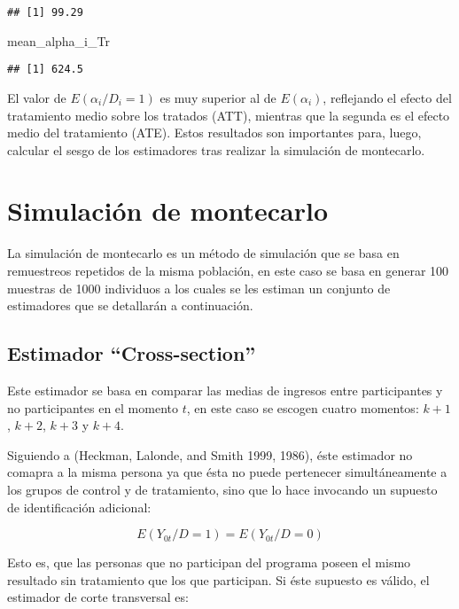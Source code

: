 \documentclass[]{article}
\newenvironment{Shaded}{\begin{snugshade}}{\end{snugshade}}
\newcommand{\NormalTok}[1]{{#1}}
\begin{document}
\begin{verbatim}
## [1] 99.29
\end{verbatim}

\begin{Shaded}
\begin{Highlighting}[]
\NormalTok{mean_alpha_i_Tr}
\end{Highlighting}
\end{Shaded}

\begin{verbatim}
## [1] 624.5
\end{verbatim}

El valor de $E(\alpha_{i}/D_{i}=1)$ es muy superior al de
$E(\alpha_{i})$, reflejando el efecto del tratamiento medio sobre los
tratados (ATT), mientras que la segunda es el efecto medio del
tratamiento (ATE). Estos resultados son importantes para, luego,
calcular el sesgo de los estimadores tras realizar la simulación de
montecarlo.

\section{Simulación de montecarlo}\label{simulacion-de-montecarlo}

La simulación de montecarlo es un método de simulación que se basa en
remuestreos repetidos de la misma población, en este caso se basa en
generar 100 muestras de 1000 individuos a los cuales se les estiman un
conjunto de estimadores que se detallarán a continuación.

\subsection{Estimador ``Cross-section''}\label{estimador-cross-section}

Este estimador se basa en comparar las medias de ingresos entre
participantes y no participantes en el momento $t$, en este caso se
escogen cuatro momentos: $k+1$, $k+2$, $k+3$ y $k+4$.

Siguiendo a (Heckman, Lalonde, and Smith 1999, 1986), éste estimador no
comapra a la misma persona ya que ésta no puede pertenecer
simultáneamente a los grupos de control y de tratamiento, sino que lo
hace invocando un supuesto de identificación adicional:

\[ E(Y_{0t}/D=1)=E(Y_{0t}/D=0) \]

Esto es, que las personas que no participan del programa poseen el mismo
resultado sin tratamiento que los que participan. Si éste supuesto es
válido, el estimador de corte transversal es:
\end{document}
